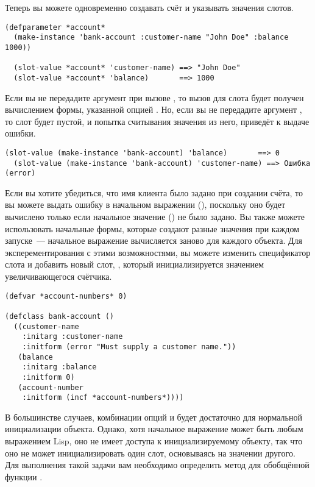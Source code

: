Теперь вы можете одновременно создавать счёт и указывать значения слотов.

\begin{lstlisting}
(defparameter *account*
  (make-instance 'bank-account :customer-name "John Doe" :balance 1000))

  (slot-value *account* 'customer-name) ==> "John Doe"
  (slot-value *account* 'balance)       ==> 1000
\end{lstlisting}

Если вы не передадите аргумент  при вызове , то вызов
 для слота  будет получен вычислением формы, указанной
опцией .  Но, если вы не передадите аргумент , то
слот  будет пустой, и попытка считывания значения из него, приведёт к
выдаче ошибки.

\begin{lstlisting}[style=lisprepl]
  (slot-value (make-instance 'bank-account) 'balance)       ==> 0
  (slot-value (make-instance 'bank-account) 'customer-name) ==> Ошибка (error)
\end{lstlisting}

Если вы хотите убедиться, что имя клиента было задано при создании счёта, то вы можете
выдать ошибку в начальном выражении (), поскольку оно будет вычислено
только если начальное значение () не было задано.  Вы также можете
использовать начальные формы, которые создают разные значения при каждом запуске~---
начальное выражение вычисляется заново для каждого объекта.  Для эксперементирования с
этими возможностями, вы можете изменить спецификатор слота  и добавить
новый слот, , который инициализируется значением увеличивающегося
счётчика.

\begin{lstlisting}
(defvar *account-numbers* 0)

(defclass bank-account ()
  ((customer-name
    :initarg :customer-name
    :initform (error "Must supply a customer name."))
   (balance
    :initarg :balance
    :initform 0)
   (account-number
    :initform (incf *account-numbers*))))
\end{lstlisting}

В большинстве случаев, комбинации опций  и  будет
достаточно для нормальной инициализации объекта.  Однако, хотя начальное выражение может
быть любым выражением Lisp, оно не имеет доступа к инициализируемому объекту, так что оно
не может инициализировать один слот, основываясь на значении другого.  Для выполнения
такой задачи вам необходимо определить метод для обобщённой функции
.

